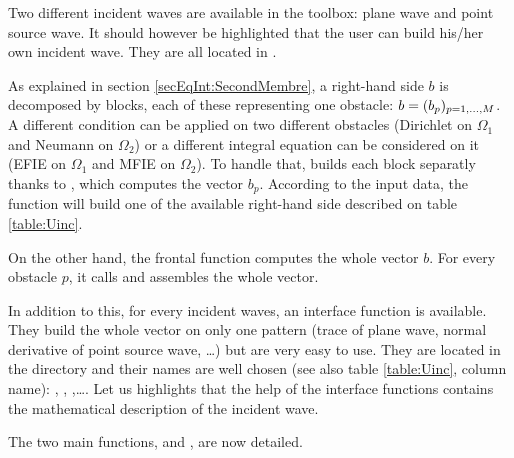 Two different incident waves are available in the \mudiff toolbox: plane wave and point source wave. It should however be highlighted that the user can build his/her own incident wave. They are all located in .

As explained in section \ref{secEqInt:SecondMembre}, a right-hand side $b$ is decomposed by blocks, each of these representing one obstacle: $b= (b_p)_{p=1,\ldots,M}$. A different condition can be applied on two different obstacles (\eg Dirichlet on $\Omega_1$ and Neumann on $\Omega_2$) or a different integral equation can be considered on it (\eg EFIE on $\Omega_1$ and MFIE on $\Omega_2$). To handle that, \mudiff builds each block separatly thanks to , which computes the vector $b_p$. According to the input data, the function will build one of the available right-hand side described on table \ref{table:Uinc}.

On the other hand, the frontal function  computes the whole vector $b$. For every obstacle $p$, it calls  and assembles the whole vector. 

In addition to this, for every incident waves, an interface function is available. They build the whole vector on only one pattern (trace of plane wave, normal derivative of point source wave, \ldots) but are very easy to use. They are located in the  directory and their names are well chosen (see also table \ref{table:Uinc}, column \mudiff name): , , ,\ldots. Let us highlights that the help of the interface functions contains the mathematical description of the incident wave.

The two main functions,  and , are now detailed.

\subsubsection{}

